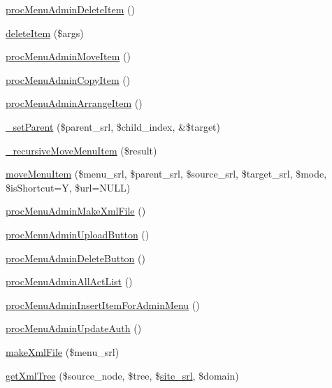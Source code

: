 \begin{DoxyCompactItemize}
\item 
\hyperlink{classmenuAdminController_a95f3b583f04dcd805696f7fd33b13d9c}{proc\+Menu\+Admin\+Delete\+Item} ()
\item 
\hyperlink{classmenuAdminController_a0a1051857eeec06de37b3d09729bd816}{delete\+Item} (\$args)
\item 
\hyperlink{classmenuAdminController_a4b1060e3cfddcffae2881a2981660b8b}{proc\+Menu\+Admin\+Move\+Item} ()
\item 
\hyperlink{classmenuAdminController_a57e5d3ee6747a38fd87eae506238e17f}{proc\+Menu\+Admin\+Copy\+Item} ()
\item 
\hyperlink{classmenuAdminController_ac803e1a5fb5bf35e30f20d727afb89dd}{proc\+Menu\+Admin\+Arrange\+Item} ()
\item 
\hyperlink{classmenuAdminController_a0eee3e8dfe3a4f9af9bd76f4776951cb}{\+\_\+set\+Parent} (\$parent\+\_\+srl, \$child\+\_\+index, \&\$target)
\item 
\hyperlink{classmenuAdminController_a663ff3838dde914ecaa1cd2875ce6848}{\+\_\+recursive\+Move\+Menu\+Item} (\$result)
\item 
\hyperlink{classmenuAdminController_af8dacd19919e854dbe083b602ea0f183}{move\+Menu\+Item} (\$menu\+\_\+srl, \$parent\+\_\+srl, \$source\+\_\+srl, \$target\+\_\+srl, \$mode, \$is\+Shortcut=\textquotesingle{}Y\textquotesingle{}, \$url=N\+U\+LL)
\item 
\hyperlink{classmenuAdminController_a8808afabf9eee859aca4150fc5d23051}{proc\+Menu\+Admin\+Make\+Xml\+File} ()
\item 
\hyperlink{classmenuAdminController_aa5f219cd08b79ff43eef69c89e7a9fd5}{proc\+Menu\+Admin\+Upload\+Button} ()
\item 
\hyperlink{classmenuAdminController_a8af649b53b356cc3b359253acd2183a2}{proc\+Menu\+Admin\+Delete\+Button} ()
\item 
\hyperlink{classmenuAdminController_a9a08d8c529270973c2dab9d62846b3b9}{proc\+Menu\+Admin\+All\+Act\+List} ()
\item 
\hyperlink{classmenuAdminController_a788f347d7232e73062a39785960a4f14}{proc\+Menu\+Admin\+Insert\+Item\+For\+Admin\+Menu} ()
\item 
\hyperlink{classmenuAdminController_aa7ae548464c3919b04a2153b6f9f2459}{proc\+Menu\+Admin\+Update\+Auth} ()
\item 
\hyperlink{classmenuAdminController_a1635d4c0dc3ace9e475422f9280e615e}{make\+Xml\+File} (\$menu\+\_\+srl)
\item 
\hyperlink{classmenuAdminController_ae924a4c2ac50c955e01e9c234d93c767}{get\+Xml\+Tree} (\$source\+\_\+node, \$tree, \$\hyperlink{ko_8install_8php_a8b1406b4ad1048041558dce6bfe89004}{site\+\_\+srl}, \$domain)

\end{DoxyCompactItemize}
